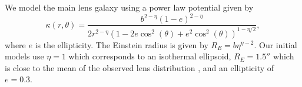 We model the main lens galaxy using a power law potential given by
\begin{equation}
\label{eqn:powerlaw}
\kappa(r, \theta) = \frac{b^{2 - \eta} (1 - e)^ {2 - \eta}}{2 r^{2 - \eta} (1 - 2 e \cos^2(\theta) + e^2\cos^2(\theta))^{1 - \eta / 2}},
\end{equation}
where $e$ is the ellipticity. The Einstein radius is given by $R_E = b \eta^{\eta - 2}$. Our initial models use $\eta = 1$ which corresponds to an isothermal ellipsoid, $R_E = 1.5''$ which is close to the mean of the observed lens distribution \citep{Sonnenfeld13}, and an ellipticity of $e = 0.3$.
